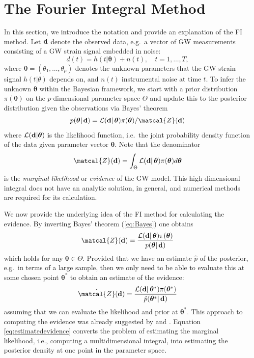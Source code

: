 \documentclass[%
 reprint,
 amsmath,amssymb,
 aps,
]{revtex4-2}
\def\btheta{\boldsymbol{\theta}}
\def\btheta{\boldsymbol{\theta}}
\renewcommand{\d}{{\bf d}}
\newcommand{\btheta}{\mbox{\boldmath $\theta$}}
\begin{document}

\section{\label{sec:FI derivation} The Fourier Integral Method}
%




In this section, we introduce the notation and provide an explanation of the FI method. Let $\d$ denote the observed data, e.g.\ a vector of GW measurements consisting of a GW strain signal embedded in noise:
\[d(t)=h(t|\btheta) + n(t),\quad t=1,\ldots,T, \]
where $\btheta=(\theta_1,\ldots,\theta_p)$ denotes the unknown parameters  that the GW strain signal $h(t|\theta)$ depends on, and $n(t)$ instrumental noise at time $t$.
To infer the unknown $\btheta$ within the Bayesian framework, we start with a prior distribution $\pi(\btheta)$ on the $p$-dimensional parameter space $\Theta$ and update this to the posterior distribution given the observations via Bayes' theorem
\begin{equation}\label{eq:Bayes}
  p(\btheta|\,\d)=\mathcal{L}(\d|\,\btheta) \pi(\btheta) / \matcal{Z}(\d)
 \end{equation}
where $\mathcal{L}(\d|\btheta)$ is the likelihood function, i.e.\ the joint probability density function of the data given parameter vector $\btheta$. Note that the denominator \[\matcal{Z}(\d)=\int_{\Theta} \mathcal{L}(\d|\,\btheta) \pi(\btheta) d\btheta\]
is the {\em marginal likelihood} or {\em evidence} of the GW model. This high-dimensional integral does not have an analytic
solution, in general, and numerical methods are required
for its calculation.

We now provide the underlying  idea of the FI method for calculating the evidence. By inverting Bayes' theorem (\ref{eq:Bayes}) one obtains
\begin{equation} \label{eq:invertedBayes}
 \matcal{Z}(\d) = \frac{\mathcal{L}(\d|\,\btheta) \pi(\btheta)}{p(\btheta|\,\d)}
 \end{equation}
which holds for any $\btheta\in \Theta$.
Provided that we have an estimate $\hat{p}$ of the posterior, e.g.\ in terms of a large sample, then we only need to be able to evaluate this at some chosen point $\btheta^*$ to obtain an estimate of the evidence:
\begin{equation}\label{eq:estimatedevidence}
\hat{\matcal{Z}}(\d) =  \frac{\mathcal{L}(\d|\,\btheta^*) \pi(\btheta^*)}{\hat{p}(\btheta^*|\,\d)}
\end{equation}
assuming that we can evaluate the likelihood and prior at $\btheta^*$.
This approach to computing the evidence was already suggested by \cite{chib1995marginal} and \cite{chib2001marginal}. Equation \eqref{eq:estimatedevidence} converts the problem of estimating the marginal likelihood, i.e., computing a multidimensional integral, into estimating the posterior density at one point in the parameter space.
\end{document}
